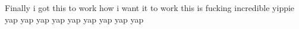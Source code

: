 \documentclass{article}
\begin{document}
\begin{flushleft}
Finally i got this to work how i want it to work this is fucking incredible yippie yap yap yap yap yap yap yap yap yap
\par
{}
\end{flushleft}
\end{document}
